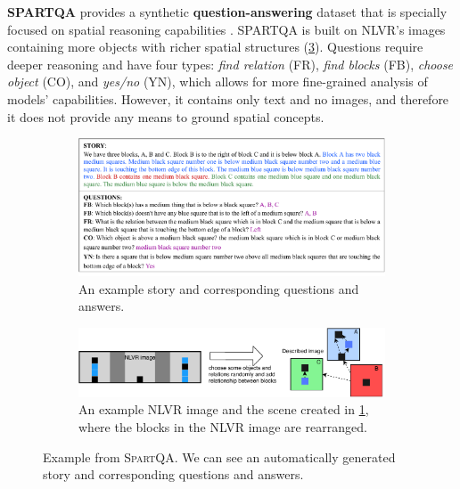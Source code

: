 \textbf{SPARTQA} provides a synthetic \textbf{question-answering} dataset that is specially focused on spatial reasoning capabilities \cite{mirzaee-etal-2021-spartqa}. SPARTQA is built on NLVR’s images containing more objects with richer spatial structures (\cref{fig:spartqa_examples}). Questions require deeper reasoning and have four types: {\em find relation} (FR), {\em find blocks} (FB), {\em choose object} (CO), and {\em yes/no} (YN), which allows for more fine-grained analysis of models' capabilities. However, it contains only text and no images, and therefore it does not provide any means to ground spatial concepts.

\begin{figure}[ht]
	\centering
	\begin{subfigure}[b]{\linewidth}
		\includegraphics[width=\linewidth]{images/datasets/spartqa_story_sample.pdf}
		\caption{An example story and corresponding questions and answers.
		}
		\label{fig:spartqa_story_sample}
	\end{subfigure}
	\begin{subfigure}[b]{\linewidth}
			\includegraphics[width=\linewidth]{images/datasets/spartqa_nlvr.pdf}
			\caption{An example NLVR image and the scene created in \cref{fig:spartqa_story_sample}, where the blocks in the NLVR image are rearranged.
			}
			\label{fig:spartqa_nlvr}
    \end{subfigure}
 	\caption{Example from \textsc{SpartQA}. We can see an automatically generated story and corresponding questions and answers.}
	\label{fig:spartqa_examples}
\end{figure}

